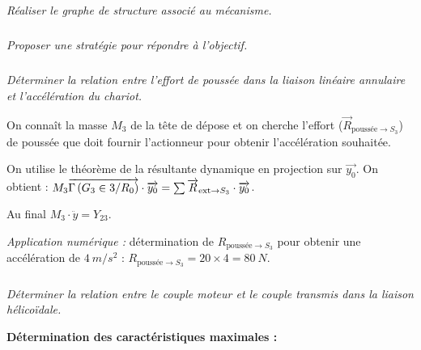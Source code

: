 \documentclass[10pt,fleqn]{article} %
\begin{document}
\begin{multicols}{2}
\begin{multicols}{2}
\subparagraph{}
\textit{Réaliser le graphe de structure associé au mécanisme.}

\subparagraph{}
\textit{Proposer une stratégie pour répondre à l'objectif.}

\subparagraph{}
\textit{Déterminer la relation entre l'effort de poussée dans la liaison linéaire annulaire et l'accélération du chariot.}
\ifprof
\begin{corrige}
On connaît la masse $M_3$ de la tête de dépose et on cherche l'effort ($\overrightarrow{R}_{\text{poussée}\to S_3}$) de poussée que doit fournir l'actionneur pour obtenir l'accélération souhaitée.


On utilise le théorème de la résultante dynamique en projection sur $\overrightarrow{y_0}$. On obtient : $
M_3 \overrightarrow{\Gamma \left( {G_3} \in {3}/{R_0}\right)}\cdot \overrightarrow{y_0}=\sum \overrightarrow{R}_{\text{ext}\to S_3}\cdot \overrightarrow{y_0}$.
 
Au final $M_3\cdot \ddot{y}=Y_{23}$.


\textit{Application numérique : } détermination de $R_{\text{pouss\'ee}\to S_3}$ pour obtenir une accélération de $\SI{4}{m/s^2}$ : $R_{\text{pouss\'ee}\to S_3}=20\times 4=\SI{80}{N}
$.
\end{corrige}
\else
\fi


\subparagraph{}
\textit{Déterminer la relation entre le couple moteur et le couple transmis dans la liaison hélicoïdale.}


\ifprof
\begin{corrige}

\textbf{Détermination des caractéristiques maximales : }



\end{corrige}
\end{multicols}
\end{multicols}
\end{document}
